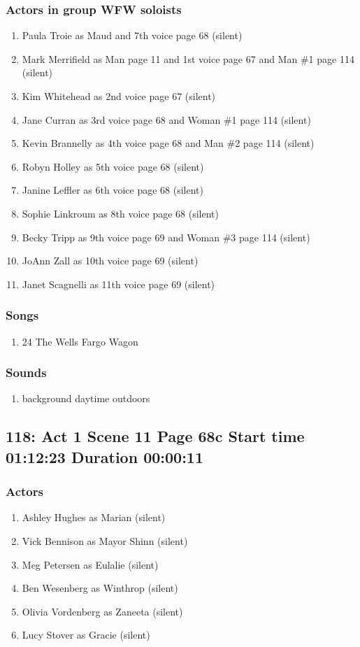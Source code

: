 \subsubsection{Actors in group WFW soloists}
\begin{enumerate}
\item Paula Troie as Maud and 7th voice page 68 (silent)
\item Mark Merrifield as Man page 11 and 1st voice page 67 and Man \#1 page 114 (silent)
\item Kim Whitehead as 2nd voice page 67 (silent)
\item Jane Curran as 3rd voice page 68 and Woman \#1 page 114 (silent)
\item Kevin Brannelly as 4th voice page 68 and Man \#2 page 114 (silent)
\item Robyn Holley as 5th voice page 68 (silent)
\item Janine Leffler as 6th voice page 68 (silent)
\item Sophie Linkroum as 8th voice page 68 (silent)
\item Becky Tripp as 9th voice page 69 and Woman \#3 page 114 (silent)
\item JoAnn Zall as 10th voice page 69 (silent)
\item Janet Scagnelli as 11th voice page 69 (silent)
\end{enumerate}

\subsubsection{Songs}
\begin{enumerate}
\item 24 The Wells Fargo Wagon
\end{enumerate}\subsubsection{Sounds}
\begin{enumerate}
\item background daytime outdoors
\end{enumerate}
\subsection{118: Act 1 Scene 11 Page 68c Start time 01:12:23 Duration 00:00:11}

\subsubsection{Actors}
\begin{enumerate}
\item Ashley Hughes as Marian (silent)
\item Vick Bennison as Mayor Shinn (silent)
\item Meg Petersen as Eulalie (silent)
\item Ben Wesenberg as Winthrop (silent)
\item Olivia Vordenberg as Zaneeta (silent)
\item Lucy Stover as Gracie (silent)
\end{enumerate}
